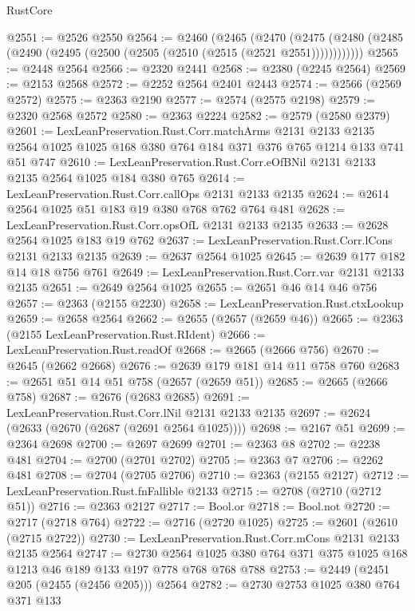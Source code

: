 \begin{lexlean}{RustCore}
\begin{coremodule}
@2551 := @2526 @2550
@2564 := @2460
    (@2465
      (@2470 (@2475 (@2480 (@2485 (@2490 (@2495 (@2500 (@2505 (@2510 (@2515 (@2521 @2551))))))))))))
@2565 := @2448 @2564
@2566 := @2320 @2441
@2568 := @2380 (@2245 @2564)
@2569 := @2153 @2568
@2572 := @2252 @2564 @2401 @2443
@2574 := @2566 (@2569 @2572)
@2575 := @2363 @2190
@2577 := @2574 (@2575 @2198)
@2579 := @2320 @2568 @2572
@2580 := @2363 @2224
@2582 := @2579 (@2580 @2379)
@2601 := LexLeanPreservation.Rust.Corr.matchArms
    @2131
    @2133
    @2135
    @2564
    @1025
    @1025
    @168
    @380
    @764
    @184
    @371
    @376
    @765
    @1214
    @133
    @741
    @51
    @747
@2610 := LexLeanPreservation.Rust.Corr.eOfBNil @2131 @2133 @2135 @2564 @1025 @184 @380 @765
@2614 := LexLeanPreservation.Rust.Corr.callOps @2131 @2133 @2135
@2624 := @2614 @2564 @1025 @51 @183 @19 @380 @768 @762 @764 @481
@2628 := LexLeanPreservation.Rust.Corr.opsOfL @2131 @2133 @2135
@2633 := @2628 @2564 @1025 @183 @19 @762
@2637 := LexLeanPreservation.Rust.Corr.lCons @2131 @2133 @2135
@2639 := @2637 @2564 @1025
@2645 := @2639 @177 @182 @14 @18 @756 @761
@2649 := LexLeanPreservation.Rust.Corr.var @2131 @2133 @2135
@2651 := @2649 @2564 @1025
@2655 := @2651 @46 @14 @46 @756
@2657 := @2363 (@2155 @2230)
@2658 := LexLeanPreservation.Rust.ctxLookup
@2659 := @2658 @2564
@2662 := @2655 (@2657 (@2659 @46))
@2665 := @2363 (@2155 LexLeanPreservation.Rust.RIdent)
@2666 := LexLeanPreservation.Rust.readOf
@2668 := @2665 (@2666 @756)
@2670 := @2645 (@2662 @2668)
@2676 := @2639 @179 @181 @14 @11 @758 @760
@2683 := @2651 @51 @14 @51 @758 (@2657 (@2659 @51))
@2685 := @2665 (@2666 @758)
@2687 := @2676 (@2683 @2685)
@2691 := LexLeanPreservation.Rust.Corr.lNil @2131 @2133 @2135
@2697 := @2624 (@2633 (@2670 (@2687 (@2691 @2564 @1025))))
@2698 := @2167 @51
@2699 := @2364 @2698
@2700 := @2697 @2699
@2701 := @2363 @8
@2702 := @2238 @481
@2704 := @2700 (@2701 @2702)
@2705 := @2363 @7
@2706 := @2262 @481
@2708 := @2704 (@2705 @2706)
@2710 := @2363 (@2155 @2127)
@2712 := LexLeanPreservation.Rust.fnFallible @2133
@2715 := @2708 (@2710 (@2712 @51))
@2716 := @2363 @2127
@2717 := Bool.or
@2718 := Bool.not
@2720 := @2717 (@2718 @764)
@2722 := @2716 (@2720 @1025)
@2725 := @2601 (@2610 (@2715 @2722))
@2730 := LexLeanPreservation.Rust.Corr.mCons @2131 @2133 @2135 @2564
@2747 := @2730
    @2564
    @1025
    @380
    @764
    @371
    @375
    @1025
    @168
    @1213
    @46
    @189
    @133
    @197
    @778
    @768
    @768
    @788
@2753 := @2449 (@2451 @205 (@2455 (@2456 @205))) @2564
@2782 := @2730
    @2753
    @1025
    @380
    @764
    @371
    @133

\end{coremodule}
\end{lexlean}
